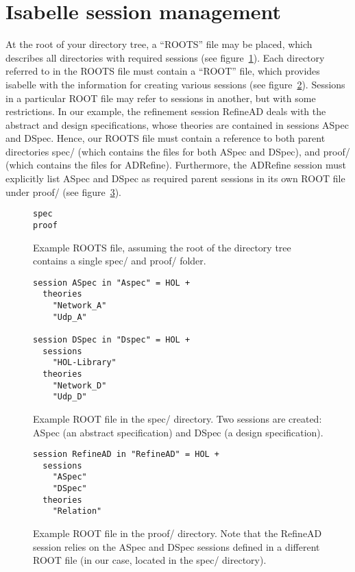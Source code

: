 \documentclass[twoside]{memoir}
\begin{document}
\section{Isabelle session management}
At the root of your directory tree, a ``ROOTS'' file may be placed, which describes all directories with required sessions (see figure~\ref{fig:isabelle-roots-file}).
Each directory referred to in the ROOTS file must contain a ``ROOT'' file, which provides isabelle with the information for creating various sessions
(see figure~\ref{fig:isabelle-root-file-spec}).
Sessions in a particular ROOT file may refer to sessions in another, but with some restrictions.
In our example, the refinement session RefineAD deals with the abstract and design specifications, whose theories are contained in sessions
ASpec and DSpec.
Hence, our ROOTS file must contain a reference to both parent directories spec/ (which contains the files for both ASpec and DSpec), and proof/
(which contains the files for ADRefine).
Furthermore, the ADRefine session must explicitly list ASpec and DSpec as required parent sessions in its own ROOT file under proof/ (see figure~\ref{fig:isabelle-root-file-proof}).

\begin{figure}[htpb]
    \centering
    \begin{lstlisting}[language=file]
spec
proof
    \end{lstlisting}
    
    \caption{Example ROOTS file, assuming the root of the directory tree contains a single spec/ and proof/ folder.}
    \label{fig:isabelle-roots-file}
\end{figure}

\begin{figure}[htpb]
    \centering
    \begin{lstlisting}[language=isabelle]
session ASpec in "Aspec" = HOL +
  theories
    "Network_A"
    "Udp_A"

session DSpec in "Dspec" = HOL +
  sessions
    "HOL-Library"
  theories
    "Network_D"
    "Udp_D"
    \end{lstlisting}
    
    \caption{Example ROOT file in the spec/ directory. Two sessions are created: ASpec (an abstract specification) and DSpec (a design specification).}
    \label{fig:isabelle-root-file-spec}
\end{figure}

\begin{figure}[htpb]
    \centering
    \begin{lstlisting}[language=isabelle]
session RefineAD in "RefineAD" = HOL +
  sessions
    "ASpec"
    "DSpec"
  theories
    "Relation"
    \end{lstlisting}
    
    \caption{Example ROOT file in the proof/ directory. Note that the RefineAD session relies on the ASpec and DSpec sessions defined in a different ROOT file (in our case, located in the spec/ directory).}
    \label{fig:isabelle-root-file-proof}
\end{figure}
\end{document}
